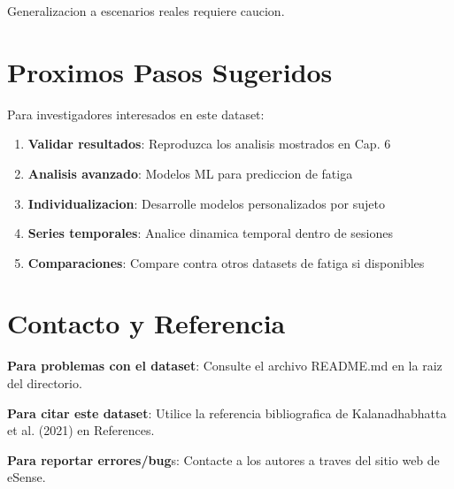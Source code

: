 Generalizacion a escenarios reales requiere caucion.

\section{Proximos Pasos Sugeridos}

Para investigadores interesados en este dataset:

\begin{enumerate}
    \item \textbf{Validar resultados}: Reproduzca los analisis mostrados en Cap. 6
    \item \textbf{Analisis avanzado}: Modelos ML para prediccion de fatiga
    \item \textbf{Individualizacion}: Desarrolle modelos personalizados por sujeto
    \item \textbf{Series temporales}: Analice dinamica temporal dentro de sesiones
    \item \textbf{Comparaciones}: Compare contra otros datasets de fatiga si disponibles
\end{enumerate}

\section{Contacto y Referencia}

\textbf{Para problemas con el dataset}:
Consulte el archivo README.md en la raiz del directorio.

\textbf{Para citar este dataset}:
Utilice la referencia bibliografica de Kalanadhabhatta et al. (2021) en References.

\textbf{Para reportar errores/bug}s:
Contacte a los autores a traves del sitio web de eSense.

